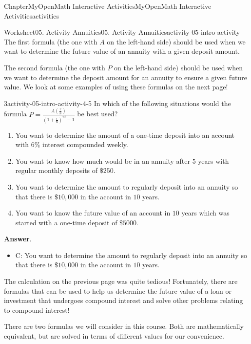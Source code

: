 \documentclass[oneside,10pt,]{book}
\newcommand{\blocktitlefont}{\relax}
\newcommand{\ptxlistdisc}{\raisebox{0.3ex}{\textbullet}}
\begin{document}
\begin{chapterptx}{Chapter}{MyOpenMath Interactive Activities}{}{MyOpenMath Interactive Activities}{}{}{activities}
\begin{worksheet-section}{Worksheet}{05. Activity Annuities}{}{05. Activity Annuities}{}{}{activity-05-intro-activity}
The first formula (the one with \(A\) on the left-hand side) should be used when we want to determine the future value of an annuity with a given deposit amount.%
\par
The second formula (the one with \(P\) on the left-hand side) should be used when we want to determine the deposit amount for an annuity to ensure a given future value. We look at some examples of using these formulas on the next page!%
\begin{divisionexercise}{3}{}{}{activity-05-intro-activity-4-5}%
In which of the following situations would the formula \(\displaystyle{P}=\frac{{{A}{\left(\frac{{r}}{{n}}\right)}}}{{{\left({1}+\frac{{r}}{{n}}\right)}^{{{n}{t}}}-{1}}}\) be best used?%
\par
%
\begin{enumerate}[label={(\alph*)}]
\item{}You want to determine the amount of a one-time deposit into an account with \(\displaystyle{6}\%\) interest compounded weekly.%
\item{}You want to know how much would be in an annuity after \(\displaystyle{5}\) years with regular monthly deposits of \(\displaystyle\${250}\).%
\item{}You want to determine the amount to regularly deposit into an annuity so that there is \(\displaystyle\${10},{000}\) in the account in \(\displaystyle{10}\) years.%
\item{}You want to know the future value of an account in \(\displaystyle{10}\) years which was started with a one-time deposit of \(\displaystyle\${5000}\).%
\end{enumerate}
%
\par\smallskip%
\noindent\textbf{\blocktitlefont Answer}.\hypertarget{activity-05-intro-activity-4-5-2}{}\quad{}%
\begin{itemize}[label=\ptxlistdisc]
\item{}C: You want to determine the amount to regularly deposit into an annuity so that there is \(\displaystyle\${10},{000}\) in the account in \(\displaystyle{10}\) years.%
\end{itemize}
%
\end{divisionexercise}%
\clearpage
The calculation on the previous page was quite tedious! Fortunately, there are formulas that can be used to help us determine the future value of a loan or investment that undergoes compound interest and solve other problems relating to compound interest!%
\par
There are two formulas we will consider in this course. Both are mathematically equivalent, but are solved in terms of different values for our convenience.%

\end{worksheet-section}
\end{chapterptx}
\end{document}

